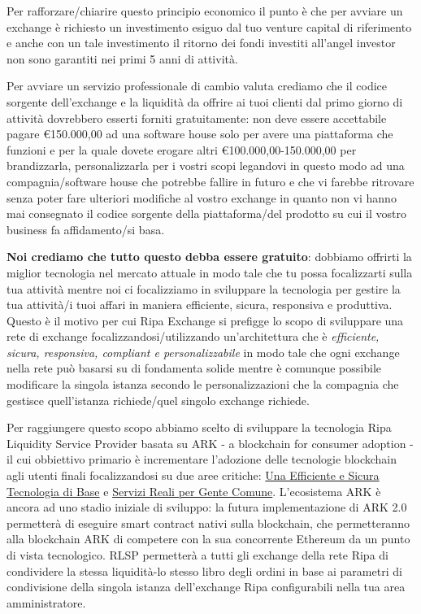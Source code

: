 \documentclass[11pt,fleqn,oneside]{book} %
\begin{document}
Per rafforzare/chiarire questo principio economico il punto è che per avviare un exchange è richiesto un investimento esiguo dal tuo 
venture capital di riferimento e anche con un tale investimento il ritorno dei fondi investiti all'angel investor non sono garantiti
nei primi 5 anni di attività.

Per avviare un servizio professionale di cambio valuta crediamo che il codice sorgente dell'exchange e la liquidità da offrire ai tuoi clienti
dal primo giorno di attività dovrebbero esserti forniti gratuitamente: non deve essere accettabile pagare \euro150.000,00 ad una software house
solo per avere una piattaforma che funzioni e per la quale dovete erogare altri \euro100.000,00-150.000,00 per brandizzarla, personalizzarla
per i vostri scopi legandovi in questo modo ad una compagnia/software house che potrebbe fallire in futuro e che vi farebbe ritrovare
senza poter fare ulteriori modifiche al vostro exchange in quanto non vi hanno mai consegnato il codice sorgente della piattaforma/del prodotto
su cui il vostro business fa affidamento/si basa.

\textbf{Noi crediamo che tutto questo debba essere gratuito}: dobbiamo offrirti la miglior tecnologia nel mercato attuale in modo tale che tu 
possa focalizzarti sulla tua attività mentre noi ci focalizziamo in sviluppare la tecnologia per gestire la tua attività/i tuoi affari
in maniera efficiente, sicura, responsiva e produttiva. Questo è il motivo per cui Ripa Exchange si prefigge lo scopo di sviluppare una rete di exchange
focalizzandosi/utilizzando un'architettura che è \textit{efficiente, sicura, responsiva, compliant e personalizzabile} in modo tale che ogni exchange
nella rete può basarsi su di fondamenta solide mentre è comunque possibile modificare la singola istanza secondo le personalizzazioni 
che la compagnia che gestisce quell'istanza richiede/quel singolo exchange richiede.

Per raggiungere questo scopo abbiamo scelto di sviluppare la tecnologia Ripa Liquidity Service Provider basata su ARK - a blockchain for consumer adoption - 
il cui obbiettivo primario è incrementare l'adozione delle tecnologie blockchain agli utenti finali focalizzandosi su due aree critiche: 
\underline{Una Efficiente e Sicura Tecnologia di Base} e \underline{Servizi Reali per Gente Comune}. L'ecosistema ARK è ancora ad uno stadio
iniziale di sviluppo: la futura implementazione di ARK 2.0 permetterà di eseguire smart contract nativi sulla blockchain, che permetteranno
alla blockchain ARK di competere con la sua concorrente Ethereum da un punto di vista tecnologico. RLSP permetterà a tutti gli exchange della rete Ripa
di condividere la stessa liquidità-lo stesso libro degli ordini in base ai parametri di condivisione della singola istanza dell'exchange Ripa
configurabili nella tua area amministratore.
\end{document}
